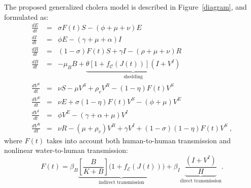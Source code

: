 The proposed generalized cholera model is described in Figure~\ref{diagram}, and formulated as:
\begin{eqnarray} \label{eq:fullmodel}
 \frac{dE}{dt} &=& \sigma F(t) S - (\phi + \mu +\nu) E \label{eq:E2}\\
 \frac{dI}{dt} &=& \phi E - (\gamma + \mu + \alpha) I \label{eq:I2}\\
 \frac{dR}{dt} &=& (1-\sigma) F(t) S + \gamma I - (\rho + \mu+\nu) R \label{eq:R2}\\
 \frac{dB}{dt} &=& - \mu_B B +\underbrace{\theta\left[1 + f_{\mathcal{C}}\left(J(t)\right) \right] (I+V^I)}_{\text{shedding}} \label{eq:B2}\\
\frac{dV^S}{dt} &=& \nu S - \mu V^S+ \rho_{v} V^R - (1-\eta) F(t) V^S \label{eq:VS2}\\
 \frac{dV^E}{dt} &=& \nu E + \sigma (1-\eta) F(t) V^S-(\phi + \mu) V^E \label{eq:VE2}\\
 \frac{dV^I}{dt} &=&  \phi V^E -(\gamma + \alpha + \mu) V^I \label{eq:VI2}\\
 \frac{dV^R}{dt} &=& \nu R -(\mu +\rho_{v})V^R +\gamma V^I +(1-\sigma) (1-\eta) F(t) V^S\label{eq:VR2}\; ,
\end{eqnarray}
where $F(t)$ takes into account both human-to-human transmission and nonlinear water-to-human transmission:
\begin{equation}
  F(t) = \beta_B \underbrace{ \left[\frac{B}{K + B} \right] \bigg(1+f_{\mathcal{E}}\left(J(t)\right)\bigg)}_{\text{indirect transmission}} + \beta_{I} \underbrace{\frac{(I+V^I)}{H}}_{\text{direct transmission}}.
\label{eq:force2}
\end{equation}

